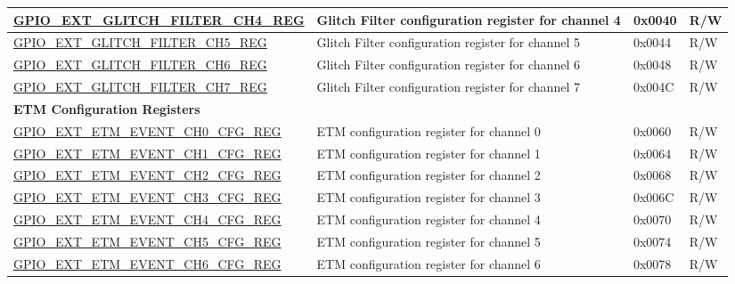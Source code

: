 \begin{longtable}{ | p{6.2cm} | p{7.2cm} | p{1.3cm} | p{1cm} | }
\hyperref[regdesc:GPIOSDGLITCHFILTERCHNREG]{GPIO\_EXT\_GLITCH\_FILTER\_CH4\_REG} & Glitch Filter configuration register for channel 4 & 0x0040 & R/W \\ \hline

\hyperref[regdesc:GPIOSDGLITCHFILTERCHNREG]{GPIO\_EXT\_GLITCH\_FILTER\_CH5\_REG} & Glitch Filter configuration register for channel 5 & 0x0044 & R/W \\ \hline

\hyperref[regdesc:GPIOSDGLITCHFILTERCHNREG]{GPIO\_EXT\_GLITCH\_FILTER\_CH6\_REG} & Glitch Filter configuration register for channel 6 & 0x0048 & R/W \\ \hline

\hyperref[regdesc:GPIOSDGLITCHFILTERCHNREG]{GPIO\_EXT\_GLITCH\_FILTER\_CH7\_REG} & Glitch Filter configuration register for channel 7 & 0x004C & R/W \\ \hline

\multicolumn{4}{|l|}{\textbf{ETM Configuration Registers}} \\ \hline

\hyperref[regdesc:GPIOSDETMEVENTCHNCFGREG]{GPIO\_EXT\_ETM\_EVENT\_CH0\_CFG\_REG} & ETM configuration register for channel 0 & 0x0060 & R/W \\ \hline

\hyperref[regdesc:GPIOSDETMEVENTCHNCFGREG]{GPIO\_EXT\_ETM\_EVENT\_CH1\_CFG\_REG} & ETM configuration register for channel 1 & 0x0064 & R/W \\ \hline

\hyperref[regdesc:GPIOSDETMEVENTCHNCFGREG]{GPIO\_EXT\_ETM\_EVENT\_CH2\_CFG\_REG} & ETM configuration register for channel 2 & 0x0068 & R/W \\ \hline

\hyperref[regdesc:GPIOSDETMEVENTCHNCFGREG]{GPIO\_EXT\_ETM\_EVENT\_CH3\_CFG\_REG} & ETM configuration register for channel 3 & 0x006C & R/W \\ \hline

\hyperref[regdesc:GPIOSDETMEVENTCHNCFGREG]{GPIO\_EXT\_ETM\_EVENT\_CH4\_CFG\_REG} & ETM configuration register for channel 4 & 0x0070 & R/W \\ \hline

\hyperref[regdesc:GPIOSDETMEVENTCHNCFGREG]{GPIO\_EXT\_ETM\_EVENT\_CH5\_CFG\_REG} & ETM configuration register for channel 5 & 0x0074 & R/W \\ \hline

\hyperref[regdesc:GPIOSDETMEVENTCHNCFGREG]{GPIO\_EXT\_ETM\_EVENT\_CH6\_CFG\_REG} & ETM configuration register for channel 6 & 0x0078 & R/W \\ \hline


\end{longtable}
